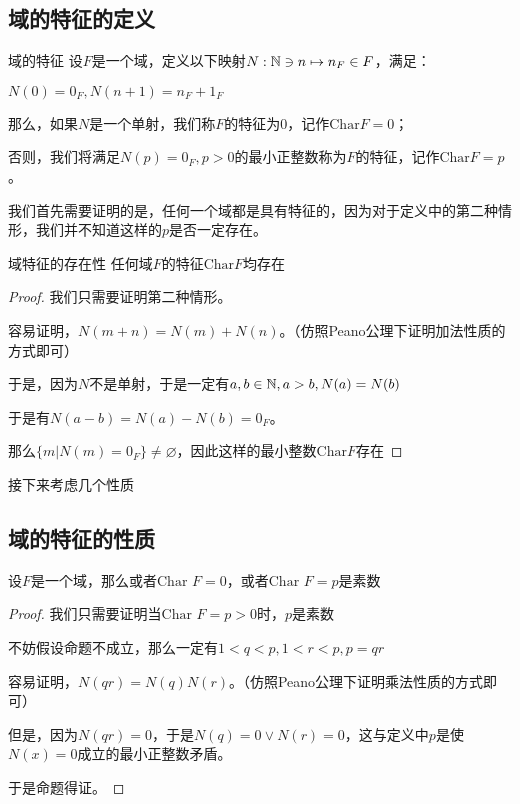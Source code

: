 \documentclass[12pt, a4paper, oneside, UTF8]{ctexbook}
\begin{document}
		\subsection{域的特征的定义}
			\begin{defn}{域的特征}{}
				设$F$是一个域，定义以下映射$N:\mathbb{N} \ni n \mapsto n_F \in F$，满足：
				
				$N(0)=0_F,N(n+1)=n_F+1_F$
				
				那么，如果$N$是一个单射，我们称$F$的特征为$0$，记作$\text{Char} F=0$；
				
				否则，我们将满足$N(p)=0_F,p > 0$的最小正整数称为$F$的特征，记作$\text{Char} F = p$。
			\end{defn}
			我们首先需要证明的是，任何一个域都是具有特征的，因为对于定义中的第二种情形，我们并不知道这样的$p$是否一定存在。
			\begin{them}{域特征的存在性}{}
				任何域$F$的特征$\text{Char} F$均存在
			\end{them}
			\begin{proof}
				我们只需要证明第二种情形。
				
				容易证明，$N(m+n)=N(m)+N(n)$。（仿照Peano公理下证明加法性质的方式即可）
				
				于是，因为$N$不是单射，于是一定有$a,b\in \mathbb{N} ,a > b,N(a)=N(b)$
				
				于是有$N(a-b)=N(a)-N(b)=0_F$。
				
				那么$\{m|N(m)=0_F\}\neq \varnothing$，因此这样的最小整数$\text{Char}F$存在
			\end{proof}
		接下来考虑几个性质
		\subsection{域的特征的性质}
			\begin{proposition}
				设$F$是一个域，那么或者$\text{Char }F=0$，或者$\text{Char }F =p$是素数
			\end{proposition}
			\begin{proof}
				我们只需要证明当$\text{Char }F =p>0$时，$p$是素数

				不妨假设命题不成立，那么一定有$1 < q < p,1 < r < p,p=qr$

				容易证明，$N(qr)=N(q)N(r)$。（仿照Peano公理下证明乘法性质的方式即可）

				但是，因为$N(qr)=0$，于是$N(q)=0 \vee N(r) = 0$，这与定义中$p$是使$N(x)=0$成立的最小正整数矛盾。

				于是命题得证。
			\end{proof}
\end{document}
